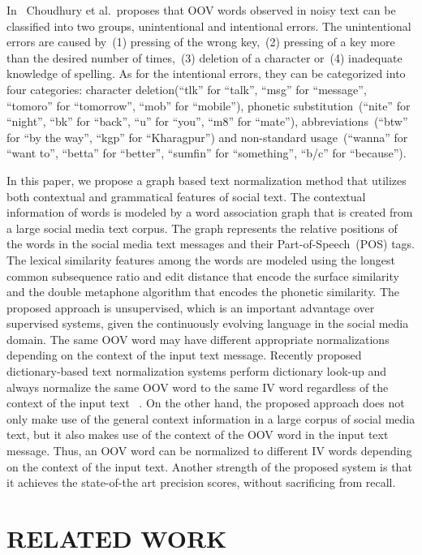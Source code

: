 \documentclass[a4paper,onesided,12pt]{report}
\begin{document}
In~\cite{Choudhury:2007:IMS:1326044.1326048} Choudhury et al.~proposes that OOV words observed in noisy text can be classified into two groups, unintentional and intentional errors. The unintentional errors are caused by~(1) pressing of the wrong key,~(2) pressing of a key more than the desired number of times,~(3) deletion of a character or~(4) inadequate knowledge of spelling. As for the intentional errors, they can be categorized into four categories: character deletion(``tlk'' for ``talk'', ``msg'' for ``message'', ``tomoro'' for ``tomorrow'', ``mob'' for ``mobile''), phonetic substitution~(``nite'' for ``night'', ``bk'' for ``back'', ``u'' for ``you'', ``m8'' for ``mate''), abbreviations~(``btw'' for ``by the way'', ``kgp'' for ``Kharagpur'') and non-standard usage~(``wanna'' for ``want to'', ``betta'' for ``better'', ``sumfin'' for ``something'', ``b/c'' for ``because'').

In this paper, we propose a graph based text normalization method that utilizes both contextual and grammatical features of social text. The contextual information of words is modeled by a word association graph that is created from a large social media text corpus. The graph represents the relative positions of the words in the social media text messages and their Part-of-Speech~(POS) tags. The lexical similarity features among the words are modeled using the longest common subsequence ratio and edit distance that encode the surface similarity and the double metaphone algorithm that encodes the phonetic similarity. The proposed approach is unsupervised, which is an important advantage over supervised systems, given the continuously evolving language in the social media domain. The same OOV word may have different appropriate normalizations depending on the context of the input text message. Recently proposed dictionary-based text normalization systems perform dictionary look-up and always normalize the same OOV word to the same IV word regardless of the context of the input text ~\cite{Han:2011:LNS:2002472.2002520,DBLP:conf/acl/HassanM13}. On the other hand, the proposed approach does not only make use of the general context information in a large corpus of social media text, but it also makes use of the context of the OOV word in the input text message. Thus, an OOV word can be normalized to different IV words depending on the context of the input text. Another strength of the proposed system is that it achieves the state-of-the art precision scores, without sacrificing from recall.

\chapter{RELATED WORK}
\label{chapter:related}
\end{document}

